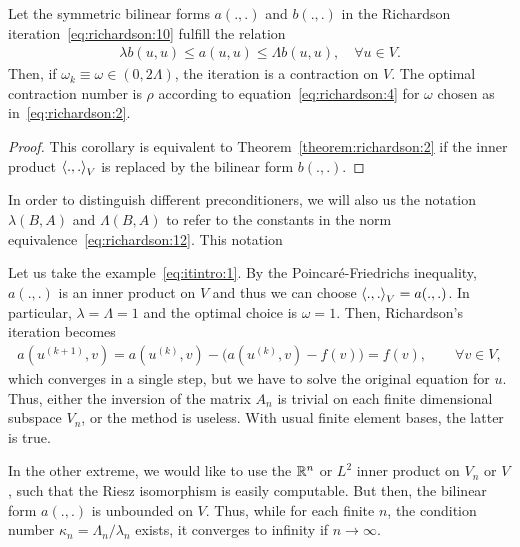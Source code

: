 \begin{corollary}
  Let the symmetric bilinear forms $a(.,.)$ and $b(.,.)$ in the
  Richardson iteration~\eqref{eq:richardson:10} fulfill the
   relation
  \begin{gather}
    \label{eq:richardson:12}
    \lambda b(u,u) \le a(u,u) \le \Lambda b(u,u), \quad \forall u\in V.
  \end{gather}
  Then, if $\omega_k \equiv \omega \in (0,2\Lambda)$, the iteration is
  a contraction on $V$. The optimal contraction number is $\rho$
  according to equation~\eqref{eq:richardson:4} for $\omega$ chosen as
  in~\eqref{eq:richardson:2}.
\end{corollary}

\begin{proof}
  This corollary is equivalent to Theorem~\ref{theorem:richardson:2}
  if the inner product $\scal(.,.)_V$ is replaced by the bilinear form
  $b(.,.)$.
\end{proof}

\begin{notation}
  In order to distinguish different preconditioners, we will also us
  the notation $\lambda(B,A)$ and $\Lambda(B,A)$ to refer to the
  constants in the norm equivalence~\eqref{eq:richardson:12}. This
  notation 
\end{notation}


\begin{example}
  Let us take the example~\eqref{eq:itintro:1}.
  By the Poincaré-Friedrichs inequality, $a(.,.)$ is an inner product
  on $V$ and thus we can choose $\scal(.,.)_V = a(.,.)$. In
  particular, $\lambda = \Lambda = 1$ and the optimal choice is
  $\omega = 1$. Then, Richardson's iteration becomes
  \begin{gather*}
    a(u^{(k+1)},v) = a(u^{(k)},v)
    - \bigl(a(u^{(k)},v) - f(v)\bigr) =  f(v), \qquad \forall v\in V,
  \end{gather*}
  which converges in a single step, but we have to solve the original
  equation for $u$. Thus, either the inversion of the matrix $A_n$ is
  trivial on each finite dimensional subspace $V_n$, or the method is
  useless. With usual finite element bases, the latter is true.
\end{example}

\begin{example}
  In the other extreme, we would like to use the $\mathbb R^n$ or $L^2$
  inner product on $V_n$ or $V$, such that the Riesz isomorphism is
  easily computable. But then, the bilinear form $a(.,.)$ is unbounded
  on $V$. Thus, while for each finite $n$, the condition number
  $\kappa_n = \Lambda_n/\lambda_n$ exists, it converges to infinity if
  $n\to\infty$.
\end{example}

